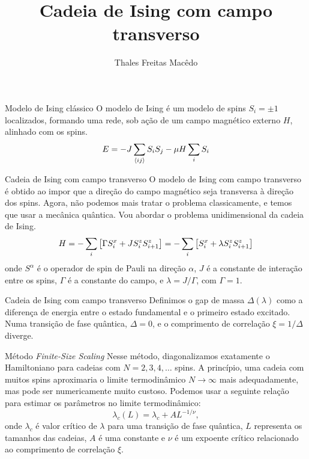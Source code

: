 \documentclass[brazil]{beamer}
\title{Cadeia de Ising com campo transverso}
\author{Thales Freitas Macêdo}
\begin{document}
\frame{\titlepage}

\begin{frame}{Modelo de Ising clássico}
    O modelo de Ising é um modelo de spins \( S_i = \pm 1 \) localizados, formando uma rede,
    sob ação de um campo magnético externo \( H \), alinhado com os spins.
    \[ E = - J \sum_{\expval{ij}} S_i S_j - \mu H \sum_i S_i \]
\end{frame}

\begin{frame}{Cadeia de Ising com campo transverso}
    O modelo de Ising com campo transverso é obtido ao impor que a direção do campo magnético
    seja transversa à direção dos spins.
    Agora, não podemos mais tratar o problema classicamente, e temos que usar a mecânica quântica.
    Vou abordar o problema unidimensional da cadeia de Ising.
    \begin{equation}
        H = - \sum_i \qty[\Gamma S_i^x + J S_i^z S_{i + 1}^z] = - \sum_i \qty[S_i^x + \lambda S_i^z S_{i + 1}^z] \label{hamiltoniano}
    \end{equation}
    onde \( S^\alpha \) é o operador de spin de Pauli na direção \( \alpha \), \( J \) é a constante de interação entre os spins,
    \( \Gamma \) é a constante do campo, e \( \lambda = J / \Gamma \), com \( \Gamma = 1 \).
\end{frame}

\begin{frame}{Cadeia de Ising com campo transverso}
    Definimos o gap de massa \( \Delta (\lambda) \) como a diferença de energia entre o estado fundamental e o primeiro estado excitado.
    Numa transição de fase quântica, \( \Delta = 0 \), e o comprimento de correlação \( \xi = 1 / \Delta \) diverge.
\end{frame}

\begin{frame}{Método \textit{Finite-Size Scaling}}
    Nesse método, diagonalizamos exatamente o Hamiltoniano para cadeias com \( N = 2, 3, 4, \dots \) spins.
    A princípio, uma cadeia com muitos spins aproximaria o limite termodinâmico \( N \to \infty \) mais adequadamente,
    mas pode ser numericamente muito custoso.
    Podemos usar a seguinte relação para estimar os parâmetros no limite termodinâmico:
    \begin{equation}
        \lambda_c (L) = \lambda_c + A L^{-1/\nu} ,
    \end{equation}
    onde \( \lambda_c \) é valor crítico de \( \lambda \) para uma transição de fase quântica, \( L \) representa os tamanhos das cadeias,
    \( A \) é uma constante e \( \nu \) é um expoente crítico relacionado ao comprimento de correlação \( \xi \).
\end{frame}
\end{document}
